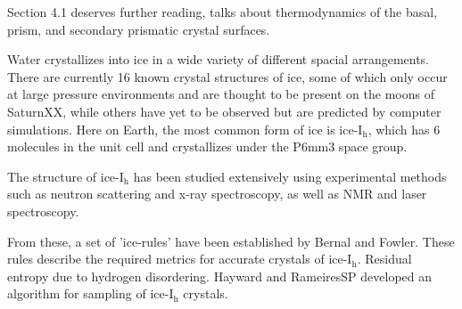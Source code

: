 Section 4.1 deserves further reading, talks about thermodynamics of
the basal, prism, and secondary prismatic crystal surfaces.

Water crystallizes into ice in a wide variety of different spacial
arrangements. There are currently 16 known crystal structures of ice,
some of which only occur at large pressure environments and are
thought to be present on the moons of SaturnXX, while others have yet
to be observed but are predicted by computer simulations. Here on
Earth, the most common form of ice is ice-I$_\mathrm{h}$, which has 6
molecules in the unit cell and crystallizes under the P6mm3 space
group.

The structure of ice-I$_\mathrm{h}$ has been studied extensively using
experimental methods such as neutron scattering and x-ray
spectroscopy, as well as NMR and laser spectroscopy.\cite{w. F. Kuhs
  and M. S. Lehmann, in Water Science Reviews 2, edited by F. Franks
  (Cambridge University, New York, 1986),pp. 1-65.} 

From these, a set of 'ice-rules' have been established by Bernal and
Fowler.\cite{} These rules describe the required metrics for accurate
crystals of ice-I$_\mathrm{h}$. Residual entropy due to hydrogen
disordering. Hayward and RameiresSP developed an algorithm for
sampling of ice-I$_\mathrm{h}$ crystals.\cite{HaywardXX}

